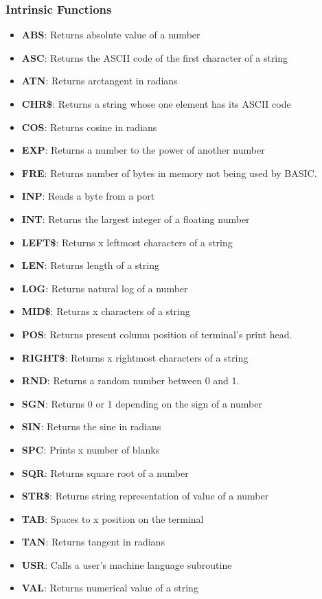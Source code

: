 \documentclass[a4paper,11pt]{article}
\begin{document}
    \subsubsection{Intrinsic Functions}

    \begin{itemize}
        \item \textbf{ABS}: Returns absolute value of a number
        \item \textbf{ASC}: Returns the ASCII code of the first character of a string
        \item \textbf{ATN}: Returns arctangent in radians
        \item \textbf{CHR\$}: Returns a string whose one element has its ASCII code
        \item \textbf{COS}: Returns cosine in radians
        \item \textbf{EXP}: Returns a number to the power of another number
        \item \textbf{FRE}: Returns number of bytes in memory not being used by BASIC.
        \item \textbf{INP}: Reads a byte from a port
        \item \textbf{INT}: Returns the largest integer of a floating number
        \item \textbf{LEFT\$}: Returns x leftmost characters of a string
        \item \textbf{LEN}: Returns length of a string
        \item \textbf{LOG}: Returns natural log of a number
        \item \textbf{MID\$}: Returns x characters of a string
        \item \textbf{POS}: Returns present column position of terminal's print head.
        \item \textbf{RIGHT\$}: Returns x rightmost characters of a string
        \item \textbf{RND}: Returns a random number between 0 and 1.
        \item \textbf{SGN}: Returns 0 or 1 depending on the sign of a number
        \item \textbf{SIN}: Returns the sine in radians
        \item \textbf{SPC}: Prints x number of blanks
        \item \textbf{SQR}: Returns square root of a number
        \item \textbf{STR\$}: Returns string representation of value of a number
        \item \textbf{TAB}: Spaces to x position on the terminal
        \item \textbf{TAN}: Returns tangent in radians
        \item \textbf{USR}: Calls a user's machine language subroutine
        \item \textbf{VAL}: Returns numerical value of a string
    \end{itemize}
\end{document}
